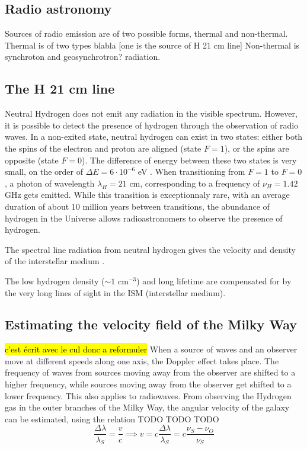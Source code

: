 \subsection{Radio astronomy }
Sources of radio emission are of two possible forms, thermal and non-thermal.
Thermal is of two types blabla [one is the source of H 21 cm line]
Non-thermal is synchroton and geosynchrotron? radiation.

\subsection{The H 21 cm line}
Neutral Hydrogen does not emit any radiation in the visible spectrum.
However, it is possible to detect the presence of hydrogen through the observation of radio waves.
In a non-exited state, neutral hydrogen can exist in two states: either both the spins of the electron and proton are aligned (state $F=1$), or the spins are opposite (state $F=0$).
The difference of energy between these two states is very small, on the order of $\Delta E = 6 \cdot 10^{-6}$ \si{\electronvolt} \cite{frederic_courbin_introduction_nodate}.
When transitioning from $F=1$ to $F=0$, a photon of wavelength $\lambda_H = 21$ cm, corresponding to a frequency of $\nu_H = 1.42$ GHz gets emitted.
While this transition is exceptionnaly rare, with an average duration of about $10$ million years between transitions, the abundance of hydrogen in the Universe allows radioastronomers to observe the presence of hydrogen.

The spectral line radiation from neutral hydrogen gives the velocity and density of the interstellar medium \cite{burke_introduction_2013}.

The low hydrogen density ($\sim 1$ cm$^{-3}$) and long lifetime are compensated for by the very long lines of sight in the ISM (interstellar medium)\cite{burke_introduction_2013}.

\subsection{Estimating the velocity field of the Milky Way}
\hl{c'est écrit avec le cul donc a reformuler}
When a source of waves and an observer move at different speeds along one axis, the Doppler effect takes place. The frequency of waves from sources moving away from the observer are shifted to a higher frequency, while sources moving away from the observer get shifted to a lower frequency. This also applies to radiowaves.
From observing the Hydrogen gas in the outer branches of the Milky Way, the angular velocity of the galaxy can be estimated, using the relation TODO TODO TODO
\begin{equation}
    \frac{\Delta \lambda}{\lambda_S} = \frac{v}{c} \implies v = c \frac{\Delta \lambda}{\lambda_S} = c \frac{\nu_S - \nu_O}{\nu_S}
\end{equation}

